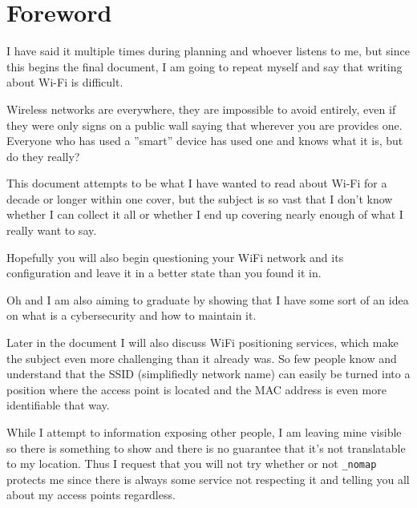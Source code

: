 \documentclass[../wifi-security.tex]{subfiles}
\begin{document}
\chapter{Foreword}

I have said it multiple times during planning and whoever listens to me, but since this begins the final document, I am going to repeat myself and say that writing about Wi-Fi is difficult.

Wireless networks are everywhere, they are impossible to avoid entirely, even if they were only signs on a public wall saying that wherever you are provides one. Everyone who has used a ''smart'' device has used one and knows what it is, but do they really?

This document attempts to be what I have wanted to read about Wi-Fi for a decade or longer within one cover, but the subject is so vast that I don't know whether I can collect it all or whether I end up covering nearly enough of what I really want to say.

Hopefully you will also begin questioning your WiFi network and its configuration and leave it in a better state than you found it in.

Oh and I am also aiming to graduate by showing that I have some sort of an idea on what is a cybersecurity and how to maintain it.

Later in the document I will also discuss WiFi positioning services, which make the subject even more challenging than it already was. So few people know and understand that the SSID (simplifiedly network name) can easily be turned into a position where the access point is located and the MAC address is even more identifiable that way.

While I attempt to  information exposing other people, I am leaving mine visible so there is something to show and there is no guarantee that it's not translatable to my location. Thus I request that you will not try whether or not \texttt{\_nomap} protects me since there is always some service not respecting it and telling you all about my access points regardless.
\end{document}
